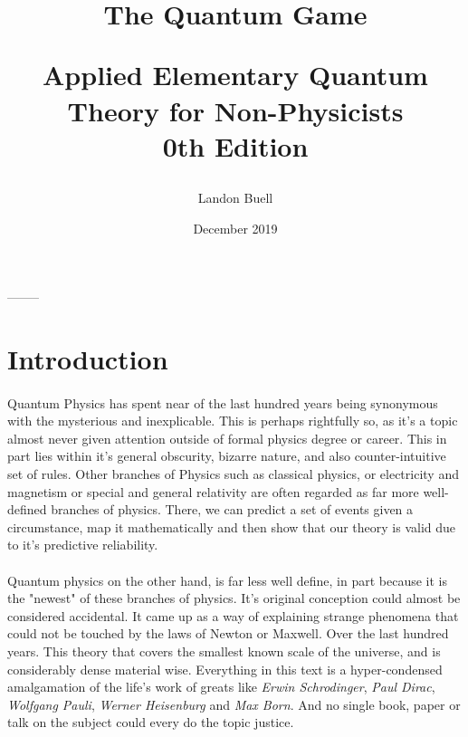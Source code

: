 \documentclass[12pt,letterpaper]{book}
\begin{document}

\title{
\begin{Huge}
The Quantum Game\\
\end{Huge}
\vspace*{5mm}
\Large Applied Elementary Quantum Theory for Non-Physicists \\
0th Edition}
\author{Landon Buell}
\date{December 2019}
\maketitle



\begin{center}
--------
\end{center}


\tableofcontents
\pagebreak


\section*{Introduction}

\paragraph*{}Quantum Physics has spent near of the last hundred years being synonymous with the mysterious and inexplicable. This is perhaps rightfully so, as it's a topic almost never given attention outside of formal physics degree or career. This in part lies within it's general obscurity, bizarre nature, and also counter-intuitive set of rules. Other branches of Physics such as classical physics, or electricity and magnetism or special and general relativity are often regarded as far more well-defined branches of physics. There, we can predict a set of events given a circumstance, map it mathematically and then show that our theory is valid due to it's predictive reliability.

\paragraph*{}Quantum physics on the other hand, is far less well define, in part because it is the "newest" of these branches of physics. It's original conception could almost be considered accidental. It came up as a way of explaining strange phenomena that could not be touched by the laws of Newton or Maxwell. Over the last hundred years. This theory that covers the smallest known scale of the universe, and is considerably dense material wise. Everything in this text is a hyper-condensed amalgamation of the life's work of greats like \textit{Erwin Schrodinger}, \textit{Paul Dirac}, \textit{Wolfgang Pauli}, \textit{Werner Heisenburg} and \textit{Max Born}. And no single book, paper or talk on the subject could every do the topic justice.
\end{document}
